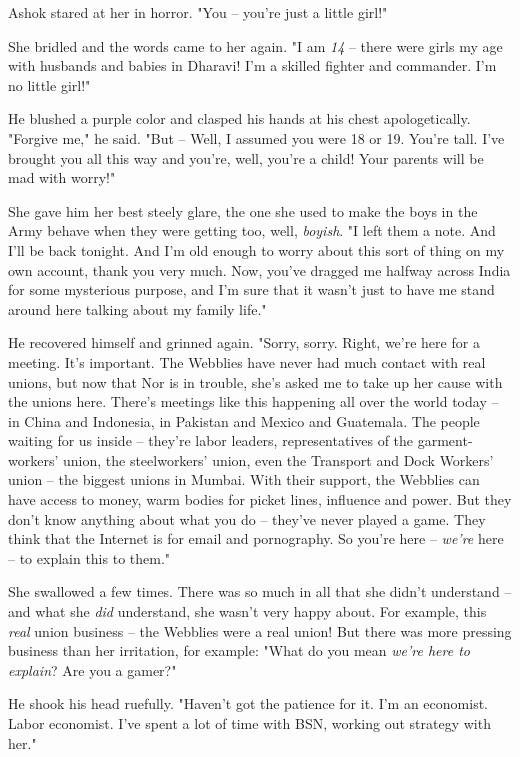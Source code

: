 Ashok stared at her in horror. "You -- you're just a little girl!"

She bridled and the words came to her again. "I am \emph{14} --
there were girls my age with husbands and babies in Dharavi! I'm a
skilled fighter and commander. I'm no little girl!"

He blushed a purple color and clasped his hands at his chest
apologetically. "Forgive me," he said. "But -- Well, I assumed you
were 18 or 19. You're tall. I've brought you all this way and
you're, well, you're a child! Your parents will be mad with
worry!"

She gave him her best steely glare, the one she used to make the
boys in the Army behave when they were getting too, well,
\emph{boyish}. "I left them a note. And I'll be back tonight. And
I'm old enough to worry about this sort of thing on my own account,
thank you very much. Now, you've dragged me halfway across India
for some mysterious purpose, and I'm sure that it wasn't just to
have me stand around here talking about my family life."

He recovered himself and grinned again. "Sorry, sorry. Right, we're
here for a meeting. It's important. The Webblies have never had
much contact with real unions, but now that Nor is in trouble,
she's asked me to take up her cause with the unions here. There's
meetings like this happening all over the world today -- in China
and Indonesia, in Pakistan and Mexico and Guatemala. The people
waiting for us inside -- they're labor leaders, representatives of
the garment-workers' union, the steelworkers' union, even the
Transport and Dock Workers' union -- the biggest unions in Mumbai.
With their support, the Webblies can have access to money, warm
bodies for picket lines, influence and power. But they don't know
anything about what you do -- they've never played a game. They
think that the Internet is for email and pornography. So you're
here -- \emph{we're} here -- to explain this to them."

She swallowed a few times. There was so much in all that she didn't
understand -- and what she \emph{did} understand, she wasn't very
happy about. For example, this \emph{real} union business -- the
Webblies were a real union! But there was more pressing business
than her irritation, for example: "What do you mean
\emph{we're here to explain}? Are you a gamer?"

He shook his head ruefully. "Haven't got the patience for it. I'm
an economist. Labor economist. I've spent a lot of time with BSN,
working out strategy with her."

